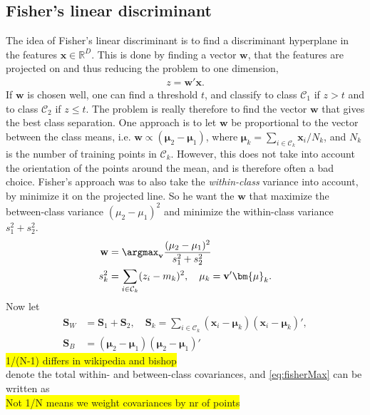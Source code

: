 \subsection{Fisher's linear discriminant}
\label{sub:Fisher's linear discriminant}
The idea of Fisher's linear discriminant is to find a discriminant hyperplane in the features $\mathbf{x}\in \mathbb{R}^D$. This is done by finding a vector $\mathbf{w}$, that the features are projected on and thus reducing the problem to one dimension,
\begin{align}
  z = \mathbf{w}'\mathbf{x}.
\end{align}
If $\mathbf{w}$ is chosen well, one can find a threshold $t$, and classify to class $\mathcal{C}_1$ if $z > t$ and to class $\mathcal{C}_2$ if $z \leq t $. The problem is really therefore to find the vector $\mathbf{w}$ that gives the best class separation. One approach is to let $\mathbf{w}$ be proportional to the vector between the class means, i.e. $\mathbf{w} \propto (\bm{\mu}_2 - \bm{\mu}_1)$, where $\bm{\mu}_k = \sum_{i \in \mathcal{C}_k} \mathbf{x}_i/N_k$, and $N_k$ is the number of training points in $\mathcal{C}_k$. 
However, this does not take into account the orientation of the points around the mean, and is therefore often a bad choice. Fisher's approach was to also take the \textit{within-class} variance into account, by minimize it on the projected line. So he want the $\mathbf{w}$ that maximize the between-class variance $(\mu_2 - \mu_1)^2$ and minimize the within-class variance $s_1^2 + s_2^2$. 
\begin{align}
  \label{eq:fisherMax} 
  \mathbf{w} &= \argmax_{\mathbf{v}} \frac{(\mu_2 - \mu_1)^2}{s_1^2 + s_2^2} \\
  s_k^2 &= \sum_{i \in \mathcal{C}_k} (z_i - m_k)^2, \quad \mu_k = \mathbf{v}'\bm{\mu}_k.
\end{align}
Now let 
\begin{align}
  \mathbf{S}_W &= \mathbf{S}_1 + \mathbf{S}_2, \quad  \mathbf{S}_k =  \sum_{i \in \mathcal{C}_k} (\mathbf{x}_i - \bm{\mu}_k)(\mathbf{x}_i - \bm{\mu}_k)', \\
  \label{eq:SB} 
  \mathbf{S}_B &= (\bm{\mu}_2 - \bm{\mu}_1)(\bm{\mu}_2 - \bm{\mu}_1)'
\end{align}
\colorbox{yellow}{1/(N-1) differs in wikipedia and bishop}\\
denote the total within- and between-class covariances, and \eqref{eq:fisherMax} can be written as
\\ \colorbox{yellow}{Not 1/N means we weight covariances by nr of points}\\
